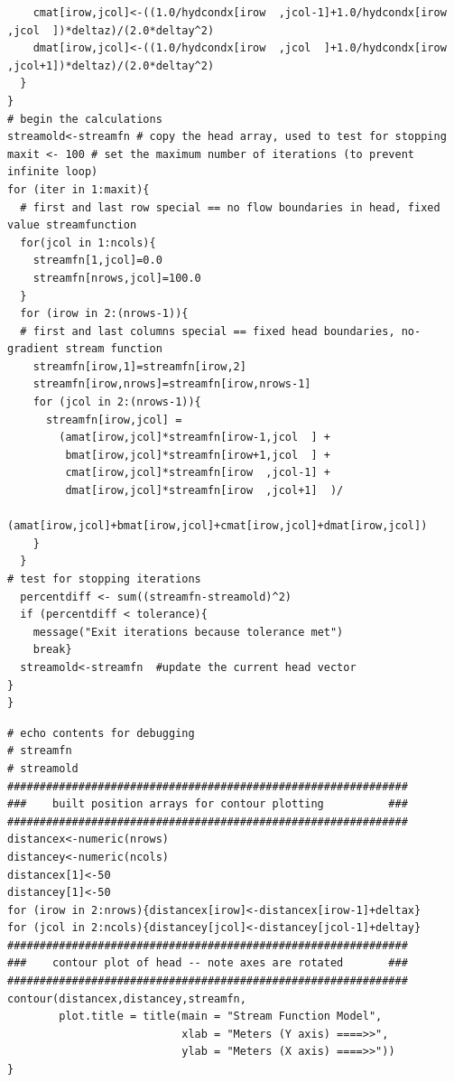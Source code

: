 \begin{lstlisting}
    cmat[irow,jcol]<-((1.0/hydcondx[irow  ,jcol-1]+1.0/hydcondx[irow  ,jcol  ])*deltaz)/(2.0*deltay^2)
    dmat[irow,jcol]<-((1.0/hydcondx[irow  ,jcol  ]+1.0/hydcondx[irow  ,jcol+1])*deltaz)/(2.0*deltay^2)
  }
}
# begin the calculations
streamold<-streamfn # copy the head array, used to test for stopping 
maxit <- 100 # set the maximum number of iterations (to prevent infinite loop)
for (iter in 1:maxit){
  # first and last row special == no flow boundaries in head, fixed value streamfunction
  for(jcol in 1:ncols){
    streamfn[1,jcol]=0.0
    streamfn[nrows,jcol]=100.0
  }
  for (irow in 2:(nrows-1)){
  # first and last columns special == fixed head boundaries, no-gradient stream function
    streamfn[irow,1]=streamfn[irow,2]
    streamfn[irow,nrows]=streamfn[irow,nrows-1]
    for (jcol in 2:(nrows-1)){
      streamfn[irow,jcol] = 
        (amat[irow,jcol]*streamfn[irow-1,jcol  ] +
         bmat[irow,jcol]*streamfn[irow+1,jcol  ] +
         cmat[irow,jcol]*streamfn[irow  ,jcol-1] +
         dmat[irow,jcol]*streamfn[irow  ,jcol+1]  )/
        (amat[irow,jcol]+bmat[irow,jcol]+cmat[irow,jcol]+dmat[irow,jcol])
    }
  }
# test for stopping iterations
  percentdiff <- sum((streamfn-streamold)^2)
  if (percentdiff < tolerance){
    message("Exit iterations because tolerance met")
    break}
  streamold<-streamfn  #update the current head vector
}
}\end{lstlisting}
\clearpage

\begin{lstlisting}[caption= R code demonstrating an Stream Function Simulator for 2D Steady Flow.  This code fragment implements the contour plotting \\ , label=lst:2D-ContourStream]
# echo contents for debugging
# streamfn
# streamold
##############################################################
###    built position arrays for contour plotting          ###
##############################################################
distancex<-numeric(nrows)
distancey<-numeric(ncols)
distancex[1]<-50
distancey[1]<-50
for (irow in 2:nrows){distancex[irow]<-distancex[irow-1]+deltax}
for (jcol in 2:ncols){distancey[jcol]<-distancey[jcol-1]+deltay}
##############################################################
###    contour plot of head -- note axes are rotated       ###
##############################################################
contour(distancex,distancey,streamfn,
        plot.title = title(main = "Stream Function Model",
                           xlab = "Meters (Y axis) ====>>", 
                           ylab = "Meters (X axis) ====>>"))
}\end{lstlisting}

